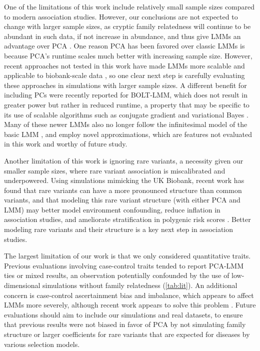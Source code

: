 \documentclass[11pt]{article}
\begin{document}
\begin{linenumbers}
One of the limitations of this work include relatively small sample sizes compared to modern association studies.
However, our conclusions are not expected to change with larger sample sizes, as cryptic family relatedness will continue to be abundant in such data, if not increase in abundance, and thus give LMMs an advantage over PCA \citep{henn_cryptic_2012, shchur_number_2018, loh_mixed-model_2018}.
One reason PCA has been favored over classic LMMs is because PCA's runtime scales much better with increasing sample size.
However, recent approaches not tested in this work have made LMMs more scalable and applicable to biobank-scale data \citep{loh_efficient_2015, zhou_efficiently_2018, mbatchou_computationally_2021}, so one clear next step is carefully evaluating these approaches in simulations with larger sample sizes.
A different benefit for including PCs were recently reported for BOLT-LMM, which does not result in greater power but rather in reduced runtime, a property that may be specific to its use of scalable algorithms such as conjugate gradient and variational Bayes \citep{loh_mixed-model_2018}.
Many of these newer LMMs also no longer follow the infinitesimal model of the basic LMM \citep{loh_efficient_2015, mbatchou_computationally_2021}, and employ novel approximations, which are features not evaluated in this work and worthy of future study.

Another limitation of this work is ignoring rare variants, a necessity given our smaller sample sizes, where rare variant association is miscalibrated and underpowered.
Using simulations mimicking the UK Biobank, recent work has found that rare variants can have a more pronounced structure than common variants, and that modeling this rare variant structure (with either PCA and LMM) may better model environment confounding, reduce inflation in association studies, and ameliorate stratification in polygenic risk scores \citep{zaidi_demographic_2020}.
Better modeling rare variants and their structure is a key next step in association studies.

The largest limitation of our work is that we only considered quantitative traits.
Previous evaluations involving case-control traits tended to report PCA-LMM ties or mixed results, an observation potentially confounded by the use of low-dimensional simulations without family relatedness (\cref{tab:lit}).
An additional concern is case-control ascertainment bias and imbalance, which appears to affect LMMs more severely, although recent work appears to solve this problem \citep{yang_advantages_2014, zhou_efficiently_2018}.
Future evaluations should aim to include our simulations and real datasets, to ensure that previous results were not biased in favor of PCA by not simulating family structure or larger coefficients for rare variants that are expected for diseases by various selection models.


\end{linenumbers}
\end{document}
